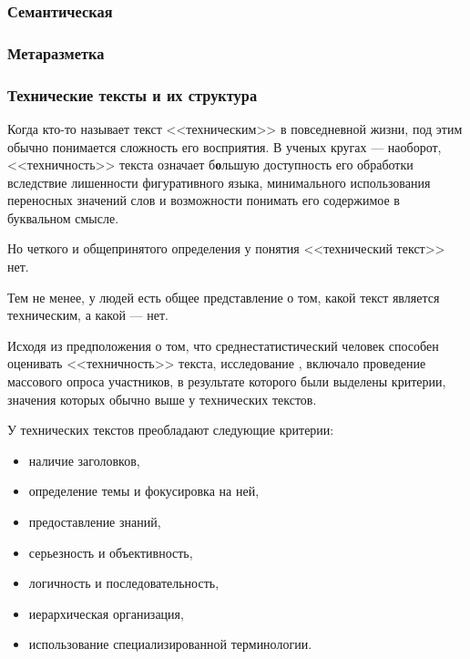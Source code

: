 \blindtext

\subsubsection*{Семантическая}

\blindtext

\subsubsection*{Метаразметка}

\blindtext

\subsubsection{Технические тексты и их структура}

Когда кто-то называет текст <<техническим>> в повседневной жизни, под этим обычно понимается сложность его восприятия.
В ученых кругах --- наоборот, <<техничность>> текста означает б\textbf{о}льшую доступность его обработки вследствие лишенности фигуративного языка, минимального использования переносных значений слов и возможности понимать его содержимое в буквальном смысле. \cite{tt}

Но четкого и общепринятого определения у понятия <<технический текст>> нет.

Тем не менее, у людей есть общее представление о том, какой текст является техническим, а какой --- нет.

Исходя из предположения о том, что среднестатистический человек способен оценивать <<техничность>> текста, исследование \cite{tt}, включало проведение массового опроса участников, в результате которого были выделены критерии, значения которых обычно выше у технических текстов.

У технических текстов преобладают следующие критерии:
\begin{itemize}
    \item наличие заголовков,
    \item определение темы и фокусировка на ней,
    \item предоставление знаний,
    \item серьезность и объективность,
    \item логичность и последовательность,
    \item иерархическая организация,
    \item использование специализированной терминологии.
\end{itemize}


